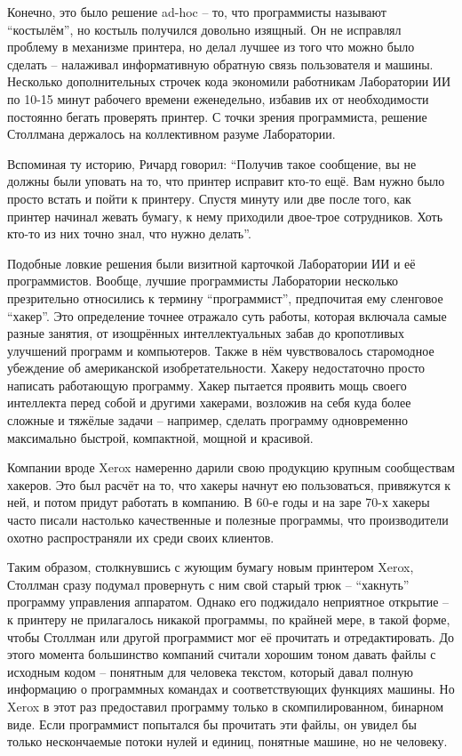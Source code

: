 Конечно, это было решение ad-hoc -- то, что программисты называют ``костылём'', но костыль получился довольно изящный. Он не исправлял проблему в механизме принтера, но делал лучшее из того что можно было сделать -- налаживал информативную обратную связь пользователя и машины. Несколько дополнительных строчек кода экономили работникам Лаборатории ИИ по 10-15 минут рабочего времени еженедельно, избавив их от необходимости постоянно бегать проверять принтер. С точки зрения программиста, решение Столлмана держалось на коллективном разуме Лаборатории.

Вспоминая ту историю, Ричард говорил: ``Получив такое сообщение, вы не должны были уповать на то, что принтер исправит кто-то ещё. Вам нужно было просто встать и пойти к принтеру. Спустя минуту или две после того, как принтер начинал жевать бумагу, к нему приходили двое-трое сотрудников. Хоть кто-то из них точно знал, что нужно делать''.

Подобные ловкие решения были визитной карточкой Лаборатории ИИ и её программистов. Вообще, лучшие программисты Лаборатории несколько презрительно относились к термину ``программист'', предпочитая ему сленговое ``хакер''. Это определение точнее отражало суть работы, которая включала самые разные занятия, от изощрённых интеллектуальных забав до кропотливых улучшений программ и компьютеров. Также в нём чувствовалось старомодное убеждение об американской изобретательности. Хакеру недостаточно просто написать работающую программу. Хакер пытается проявить мощь своего интеллекта перед собой и другими хакерами, возложив на себя куда более сложные и тяжёлые задачи -- например, сделать программу одновременно максимально быстрой, компактной, мощной и красивой.

Компании вроде Xerox намеренно дарили свою продукцию крупным сообществам хакеров. Это был расчёт на то, что хакеры начнут ею пользоваться, привяжутся к ней, и потом придут работать в компанию. В 60-е годы и на заре 70-х хакеры часто писали настолько качественные и полезные программы, что производители охотно распространяли их среди своих клиентов.

Таким образом, столкнувшись с жующим бумагу новым принтером Xerox, Столлман сразу подумал провернуть с ним свой старый трюк -- ``хакнуть'' программу управления аппаратом. Однако его поджидало неприятное открытие -- к принтеру не прилагалось никакой программы, по крайней мере, в такой форме, чтобы Столлман или другой программист мог её прочитать и отредактировать. До этого момента большинство компаний считали хорошим тоном давать файлы с исходным кодом -- понятным для человека текстом, который давал полную информацию о программных командах и соответствующих функциях машины. Но Xerox в этот раз предоставил программу только в скомпилированном, бинарном виде. Если программист попытался бы прочитать эти файлы, он увидел бы только нескончаемые потоки нулей и единиц, понятные машине, но не человеку.

